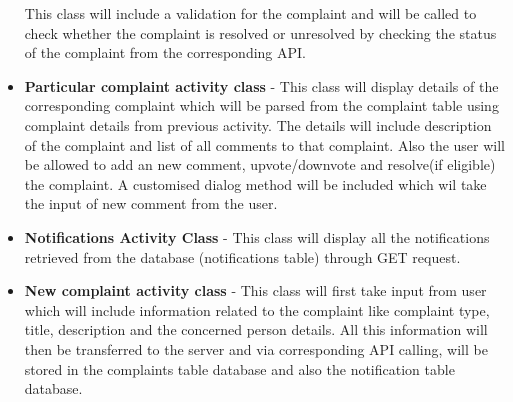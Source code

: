 \documentclass[a4paper]{article}
\begin{document}
\begin{itemize}
This class will include a validation for the complaint and will be called to check whether the complaint is resolved or unresolved by checking the status of the complaint from the corresponding API.
\item	\textbf{Particular complaint activity class} - This class will display details of the corresponding complaint which will be parsed from the complaint table using complaint details from previous activity. The details will include description of the complaint and list of all comments to that complaint. Also the user will be allowed to add an new comment, upvote/downvote and resolve(if eligible) the complaint. A customised dialog method will be included which wil take the input of new comment from the user.
\item \textbf{Notifications Activity Class} - This class will display all the notifications retrieved from the database (notifications table) through GET request.
\item \textbf{New complaint activity class} - This class will first take input from user which will include information related to the complaint like complaint type, title, description and the concerned person details. All this information will then be transferred to the server and via corresponding API calling, will be stored in the complaints table database and also the notification table database.


\end{itemize}
\end{document}

